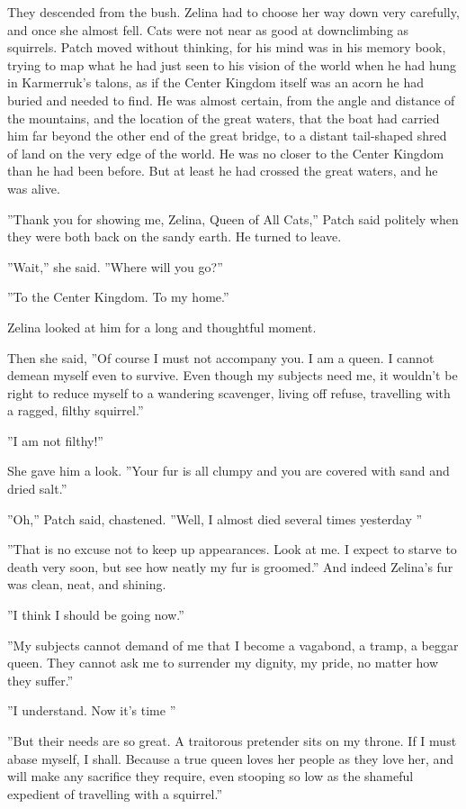 \documentclass[11pt]{article}
\begin{document}
 They descended from the bush. Zelina had to choose her way down very carefully, and once she almost fell. Cats were not near as good at downclimbing as squirrels. Patch moved without thinking, for his mind was in his memory book, trying to map what he had just seen to his vision of the world when he had hung in Karmerruk's talons, as if the Center Kingdom itself was an acorn he had buried and needed to find. He was almost certain, from the angle and distance of the mountains, and the location of the great waters, that the boat had carried him far beyond the other end of the great bridge, to a distant tail-shaped shred of land on the very edge of the world. He was no closer to the Center Kingdom than he had been before. But at least he had crossed the great waters, and he was alive.\par
 ''Thank you for showing me, Zelina, Queen of All Cats,'' Patch said politely when they were both back on the sandy earth. He turned to leave.\par
 ''Wait,'' she said. ''Where will you go?''\par
 ''To the Center Kingdom. To my home.''\par
 Zelina looked at him for a long and thoughtful moment.\par
Then she said, ''Of course I must not accompany you. I am a queen. I cannot demean myself even to survive. Even though my subjects need me, it wouldn't be right to reduce myself to a wandering scavenger, living off refuse, travelling with a ragged, filthy squirrel.''\par
 ''I am not filthy!''\par
 She gave him a look. ''Your fur is all clumpy and you are covered with sand and dried salt.''\par
 ''Oh,'' Patch said, chastened. ''Well, I almost died several times yesterday %
''\par
 ''That is no excuse not to keep up appearances. Look at me. I expect to starve to death very soon, but see how neatly my fur is groomed.'' And indeed Zelina's fur was clean, neat, and shining.\par
 ''I think I should be going now.''\par
 ''My subjects cannot demand of me that I become a vagabond, a tramp, a beggar queen. They cannot ask me to surrender my dignity, my pride, no matter how they suffer.''\par
''I understand. Now it's time %
''\par
''But their needs are so great. A traitorous pretender sits on my throne. If I must abase myself, I shall. Because a true queen loves her people as they love her, and will make any sacrifice they require, even stooping so low as the shameful expedient of travelling with a squirrel.''\par
\end{document}
